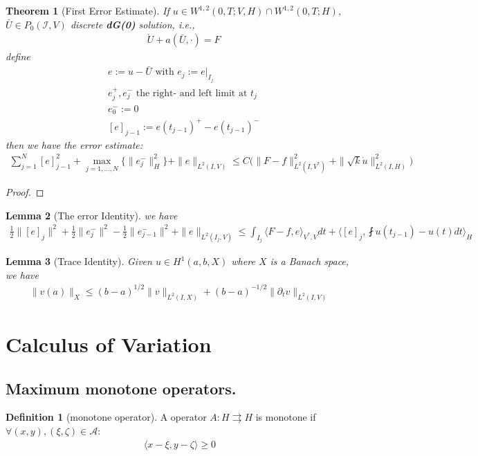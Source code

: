 \documentclass[a4paper,12pt,oneside,fleqn]{book}
\newtheorem{theorem}{Theorem}[section]
\newtheorem{lemma}[theorem]{Lemma}
\theoremstyle{definition}
\newtheorem{definition}{Definition}[section]
\theoremstyle{remark}
\begin{document}
\begin{theorem}[First Error Estimate]
If $u \in W^{1, 2}(0, T; V, H) \cap W^{1, 2}(0, T; H)$, $\bar{U} \in P_0(\mathcal{I}, V)$ discrete \textbf{dG(0)} solution, i.e., 
\begin{align*}
	&\dot{U} + a(\bar{U}, \cdot) = F
\end{align*}
define
\begin{align*}
	& e:= u - \bar{U} \text{ with } e_j:= e|_{I_j}\\
	& e^+_j, e^-_j \text{ the right- and left limit at $t_j$}\\
	& e_0^- := 0\\
	& [e]_{j - 1}:= e(t_{j -1})^+ - e(t_{j - 1})^-
\end{align*} then we have the error estimate:
\begin{align*}
	\sum_{j = 1}^N [e]_{j -1}^2 +  \max_{j = 1, \dots, N}\{\|e_j^-\|_H^2\} + \|e\|_{L^2(I, V)} \le C \bigg(\|F - f\|_{L^2(I, V^*)}^2 + \|\sqrt{k} \dot{u}\|_{L^2(I, H)}^2\bigg)
\end{align*}	
\end{theorem}
\begin{proof}
	
\end{proof}

\begin{lemma}[The error Identity]
	we have
	\begin{align*}
		\frac{1}{2}\|[e]_j\|^2 + \frac{1}{2}\|e_j^-\|^2 - \frac{1}{2}\|e_{j -1}^-\|^2 + \|e\|_{L^2(I_j, V)} \le \int_{I_j} \langle F - f, e\rangle_{V^*, V} dt + \bigg\langle [e]_j, \fint u(t_{j -1}) - u(t) dt \bigg\rangle_H
	\end{align*}
\end{lemma}

\begin{lemma}[Trace Identity]
	Given $u \in H^1(a, b, X)$ where $X$ is a Banach space, we have
	\begin{align*}
		\|v(a)\|_X \le (b - a)^{1\slash 2} \|v\|_{L^2(I, X)} + (b - a)^{- 1 \slash 2}\|\partial_t v\|_{L^2(I, V)}
	\end{align*}
\end{lemma}

\newpage
\section{Calculus of Variation}
\subsection{Maximum monotone operators.}
\begin{definition}[monotone operator]
	A operator $A: H  \rightrightarrows H$ is monotone if $\forall (x, y), (\xi, \zeta) \in \mathcal{A}$:
	\begin{align*}
		\langle x - \xi, y - \zeta \rangle \ge 0
	\end{align*}
\end{definition}
\end{document}
